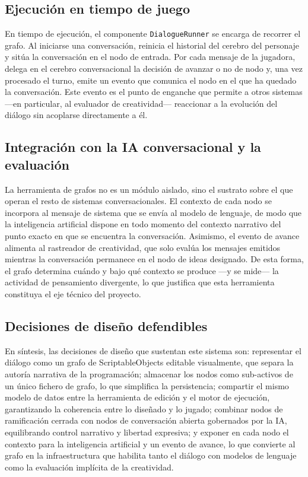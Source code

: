 \documentclass[12pt,twoside,titlepage]{report}
\begin{document}
\subsection{Ejecución en tiempo de juego}

En tiempo de ejecución, el componente \texttt{DialogueRunner} se encarga de recorrer el grafo. Al iniciarse una conversación, reinicia el historial del cerebro del personaje y sitúa la conversación en el nodo de entrada. Por cada mensaje de la jugadora, delega en el cerebro conversacional la decisión de avanzar o no de nodo y, una vez procesado el turno, emite un evento que comunica el nodo en el que ha quedado la conversación. Este evento es el punto de enganche que permite a otros sistemas ---en particular, al evaluador de creatividad--- reaccionar a la evolución del diálogo sin acoplarse directamente a él.

\subsection{Integración con la IA conversacional y la evaluación}

La herramienta de grafos no es un módulo aislado, sino el sustrato sobre el que operan el resto de sistemas conversacionales. El contexto de cada nodo se incorpora al mensaje de sistema que se envía al modelo de lenguaje, de modo que la inteligencia artificial dispone en todo momento del contexto narrativo del punto exacto en que se encuentra la conversación. Asimismo, el evento de avance alimenta al rastreador de creatividad, que solo evalúa los mensajes emitidos mientras la conversación permanece en el nodo de ideas designado. De esta forma, el grafo determina cuándo y bajo qué contexto se produce ---y se mide--- la actividad de pensamiento divergente, lo que justifica que esta herramienta constituya el eje técnico del proyecto.

\subsection{Decisiones de diseño defendibles}

En síntesis, las decisiones de diseño que sustentan este sistema son: representar el diálogo como un grafo de ScriptableObjects editable visualmente, que separa la autoría narrativa de la programación; almacenar los nodos como sub-activos de un único fichero de grafo, lo que simplifica la persistencia; compartir el mismo modelo de datos entre la herramienta de edición y el motor de ejecución, garantizando la coherencia entre lo diseñado y lo jugado; combinar nodos de ramificación cerrada con nodos de conversación abierta gobernados por la IA, equilibrando control narrativo y libertad expresiva; y exponer en cada nodo el contexto para la inteligencia artificial y un evento de avance, lo que convierte al grafo en la infraestructura que habilita tanto el diálogo con modelos de lenguaje como la evaluación implícita de la creatividad.
\end{document}
